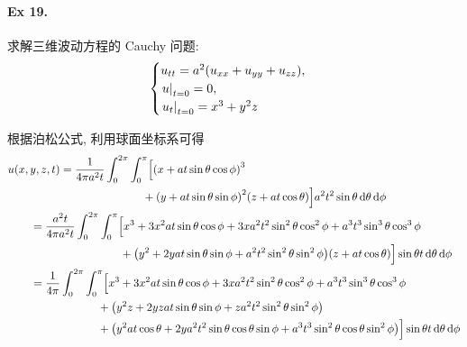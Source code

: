\paragraph{Ex 19.}
求解三维波动方程的 Cauchy 问题:
\[ \begin{cases}
u_{tt} = a^2 (u_{xx} + u_{yy} + u_{zz}), \\
{\left.{u} \right|}_{t=0} = 0, \\
{\left.{u_t} \right|}_{t=0} = x^3 + y^2 z
\end{cases} \]

\begin{solution}
根据泊松公式, 利用球面坐标系可得
\[ \begin{aligned}
&u(x, y, z, t) =
\frac{1}{4\pi a^2 t} \int_0^{2\pi} \int_0^\pi \Bigl[
    \mclosure{x + at\sin\theta \cos\phi}^3 \\
    &\hspace{12em}+\mclosure{y + at\sin\theta \sin\phi}^2 \mclosure{z + at\cos\theta}
\Bigr] a^2 t^2 \sin\theta \diff\theta \diff\phi\\
&\hspace{2em}=\frac{a^2 t}{4\pi a^2 t} \int_0^{2\pi} \int_0^\pi \Bigl[
    x^3 + 3x^2 at\sin\theta \cos\phi + 3x a^2t^2\sin^2\theta \cos^2\phi
    +a^3t^3\sin^3\theta \cos^3\phi \\
    &\hspace{10em}+\mclosure{y^2 + 2yat\sin\theta \sin\phi + a^2t^2\sin^2\theta \sin^2\phi}
    \mclosure{z + at\cos\theta}
\Bigr] \sin\theta t \diff\theta \diff\phi \\
&\hspace{2em}=\frac{1}{4\pi} \int_0^{2\pi} \int_0^\pi \Bigl[
    x^3 + 3x^2 at\sin\theta \cos\phi + 3x a^2t^2\sin^2\theta \cos^2\phi
    +a^3t^3\sin^3\theta \cos^3\phi \\
    &\hspace{8em}+\mclosure{
        y^2z + 2yzat\sin\theta \sin\phi + za^2t^2\sin^2\theta \sin^2\phi
    } \\
    &\hspace{8em}+\mclosure{
        y^2at\cos\theta
        + 2ya^2t^2\sin\theta \cos\theta \sin\phi
        + a^3t^3\sin^2\theta \cos\theta \sin^2\phi
    }
\Bigr] \sin\theta t \diff\theta \diff\phi \\
\end{aligned} \]

\end{solution}

